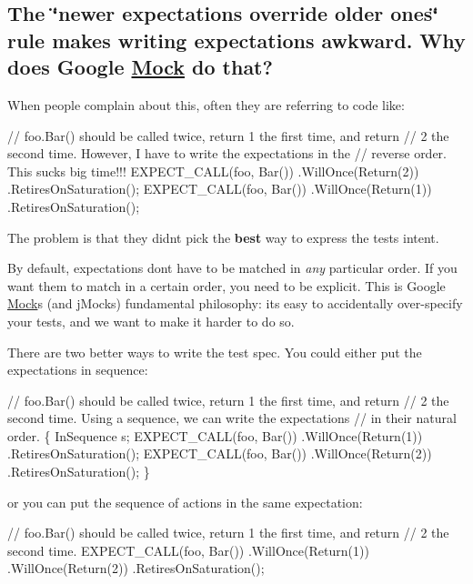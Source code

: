 \subsection*{The \char`\"{}newer expectations override older ones\char`\"{} rule makes writing expectations awkward. Why does Google \hyperlink{class_mock}{Mock} do that?}

When people complain about this, often they are referring to code like\+:


\begin{DoxyCode}
// foo.Bar() should be called twice, return 1 the first time, and return
// 2 the second time.  However, I have to write the expectations in the
// reverse order.  This sucks big time!!!
EXPECT\_CALL(foo, Bar())
    .WillOnce(Return(2))
    .RetiresOnSaturation();
EXPECT\_CALL(foo, Bar())
    .WillOnce(Return(1))
    .RetiresOnSaturation();
\end{DoxyCode}


The problem is that they didn\textquotesingle{}t pick the {\bfseries best} way to express the test\textquotesingle{}s intent.

By default, expectations don\textquotesingle{}t have to be matched in {\itshape any} particular order. If you want them to match in a certain order, you need to be explicit. This is Google \hyperlink{class_mock}{Mock}\textquotesingle{}s (and j\+Mock\textquotesingle{}s) fundamental philosophy\+: it\textquotesingle{}s easy to accidentally over-\/specify your tests, and we want to make it harder to do so.

There are two better ways to write the test spec. You could either put the expectations in sequence\+:


\begin{DoxyCode}
// foo.Bar() should be called twice, return 1 the first time, and return
// 2 the second time.  Using a sequence, we can write the expectations
// in their natural order.
\{
  InSequence s;
  EXPECT\_CALL(foo, Bar())
      .WillOnce(Return(1))
      .RetiresOnSaturation();
  EXPECT\_CALL(foo, Bar())
      .WillOnce(Return(2))
      .RetiresOnSaturation();
\}
\end{DoxyCode}


or you can put the sequence of actions in the same expectation\+:


\begin{DoxyCode}
// foo.Bar() should be called twice, return 1 the first time, and return
// 2 the second time.
EXPECT\_CALL(foo, Bar())
    .WillOnce(Return(1))
    .WillOnce(Return(2))
    .RetiresOnSaturation();
\end{DoxyCode}


